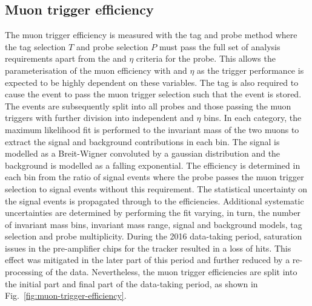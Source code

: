 \subsection{Muon trigger efficiency}

The muon trigger efficiency \cite{CMS-DP-2017-056} is measured with the tag and probe method where the tag selection $T$ and probe selection $P$ must pass the full set of analysis requirements apart from the \pt and $\eta$ criteria for the probe. This allows the parameterisation of the muon efficiency with \pt and $\eta$ as the trigger performance is expected to be highly dependent on these variables. The tag is also required to cause the event to pass the muon trigger selection such that the event is stored. The events are subsequently split into all probes and those passing the muon triggers with further division into independent \pt and $\eta$ bins. In each category, the maximum likelihood fit is performed to the invariant mass of the two muons to extract the signal and background contributions in each bin. The signal is modelled as a Breit-Wigner convoluted by a gaussian distribution and the background is modelled as a falling exponential. The efficiency is determined in each bin from the ratio of signal events where the probe passes the muon trigger selection to signal events without this requirement. The statistical uncertainty on the signal events is propagated through to the efficiencies. Additional systematic uncertainties are determined by performing the fit varying, in turn, the number of invariant mass bins, invariant mass range, signal and background models, tag selection and probe multiplicity. During the 2016 data-taking period, saturation issues in the pre-amplifier chips for the tracker resulted in a loss of hits. This effect was mitigated in the later part of this period and further reduced by a re-processing of the data. Nevertheless, the muon trigger efficiencies are split into the initial part and final part of the data-taking period, as shown in Fig.~\ref{fig:muon-trigger-efficiency}.

